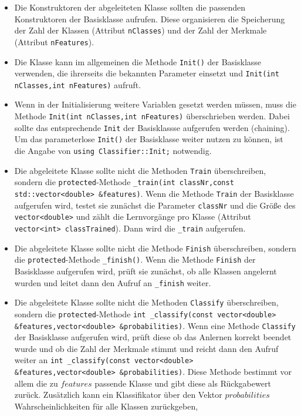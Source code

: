 \begin{itemize}
\item Die Konstruktoren der abgeleiteten Klasse sollten die passenden Konstruktoren der
Basisklasse aufrufen. Diese organisieren die Speicherung der Zahl der Klassen (Attribut \verb+nClasses+)
und der Zahl der Merkmale (Attribut \verb+nFeatures+).
\item Die Klasse kann im allgemeinen die Methode \verb+Init()+ der Basisklasse verwenden, die ihrerseits
die bekannten Parameter einsetzt und \verb+Init(int nClasses,int nFeatures)+ aufruft.
\item Wenn in der Initialisierung weitere Variablen gesetzt werden müssen, muss die Methode 
\verb+Init(int nClasses,int nFeatures)+ überschrieben werden. Dabei sollte das entsprechende \verb+Init+ der 
Basisklassse aufgerufen werden (chaining). Um das parameterlose \verb+Init()+ der Basisklasse weiter 
nutzen zu können, ist die Angabe von \verb+using Classifier::Init;+ notwendig.
\item Die abgeleitete Klasse sollte nicht die Methoden \verb+Train+ überschreiben, sondern die 
\verb+protected+-Methode \verb+_train(int classNr,const std::vector<double> &features)+. Wenn die Methode 
\verb+Train+ der Basisklasse aufgerufen wird, testet sie zunächst die Parameter \verb+classNr+ und die Größe des 
\verb+vector<double>+ und zählt die Lernvorgänge pro Klasse (Attribut \verb+vector<int> classTrained+). 
Dann wird die \verb+_train+ aufgerufen.
\item Die abgeleitete Klasse sollte nicht die Methode \verb+Finish+ überschreiben, sondern die 
\verb+protected+-Methode \verb+_finish()+. Wenn die Methode \verb+Finish+ der Basisklasse aufgerufen wird, 
prüft sie zunächst, ob alle Klassen angelernt wurden und leitet dann den Aufruf an \verb+_finish+ weiter.
\item Die abgeleitete Klasse sollte nicht die Methoden \verb+Classify+ überschreiben, sondern die 
\verb+protected+-Methode \verb+int _classify(const vector<double> &features,vector<double> &probabilities)+. 
Wenn eine Methode \verb+Classify+ der Basisklasse aufgerufen wird, prüft diese ob das Anlernen korrekt
beendet wurde und ob die Zahl der Merkmale stimmt und reicht dann den Aufruf weiter an  
\verb+int _classify(const vector<double> &features,vector<double> &probabilities)+. Diese Methode
bestimmt vor allem die zu $features$ passende Klasse und gibt diese als Rückgabewert zurück. Zusätzlich
kann ein Klassifikator über den Vektor $probabilities$ Wahrscheinlichkeiten für alle Klassen zurückgeben, 

\end{itemize}
